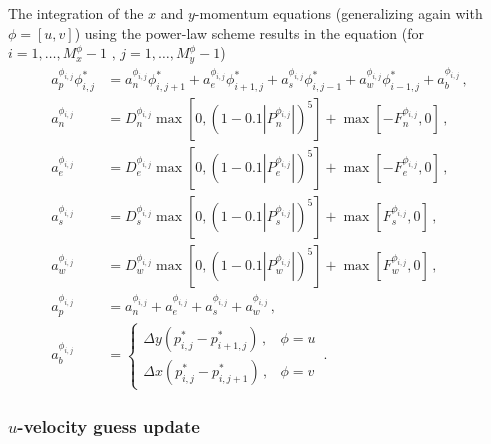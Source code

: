 \documentclass{article}
\begin{document}
The integration of the $x$ and $y$-momentum equations (generalizing again with $\phi = [u, v]$) using the power-law scheme results in the equation (for $i = 1, \ldots, M_x^\phi - 1\,\,,\, j = 1, \ldots, M_y^\phi - 1$)
\begin{subequations}
	\label{eq:power}
	\begin{align}
		a^{\phi_{i,j}}_p \phi^*_{i,j} & = a^{\phi_{i,j}}_n \phi^*_{i, j+1} + a^{\phi_{i,j}}_e \phi^*_{i+1, j} + a^{\phi_{i,j}}_s \phi^*_{i, j-1} + a^{\phi_{i,j}}_w \phi^*_{i-1, j} + a_b^{\phi_{i,j}}\,,\\
		a^{\phi_{i,j}}_n & = D^{\phi_{i,j}}_n \max \left[0, (1 - 0.1 |P^{\phi_{i,j}}_n|)^5\right] + \max \left[ -F^{\phi_{i,j}}_n, 0 \right]\,, \\
		a^{\phi_{i,j}}_e & = D^{\phi_{i,j}}_e \max \left[0, (1 - 0.1 |P^{\phi_{i,j}}_e|)^5\right] + \max \left[ -F^{\phi_{i,j}}_e, 0 \right]\,, \\
		a^{\phi_{i,j}}_s & = D^{\phi_{i,j}}_s \max \left[0, (1 - 0.1 |P^{\phi_{i,j}}_s|)^5\right] + \max \left[ F^{\phi_{i,j}}_s, 0 \right]\,, \\
		a^{\phi_{i,j}}_w & = D^{\phi_{i,j}}_w \max \left[0, (1 - 0.1 |P^{\phi_{i,j}}_w|)^5\right] + \max \left[ F^{\phi_{i,j}}_w, 0 \right]\,, \\
		a^{\phi_{i,j}}_p & = a^{\phi_{i,j}}_n + a^{\phi_{i,j}}_e + a^{\phi_{i,j}}_s + a^{\phi_{i,j}}_w\,, \\
		a^{\phi_{i,j}}_b & = \begin{cases}
			\Delta y (p^*_{i,j} - p^*_{i+1,j})\,, & \phi = u\\
			\Delta x (p^*_{i,j} - p^*_{i, j+1})\,, & \phi = v
		\end{cases}\,.
	\end{align}
\end{subequations}

\subsubsection{$u$-velocity guess update}
\end{document}
